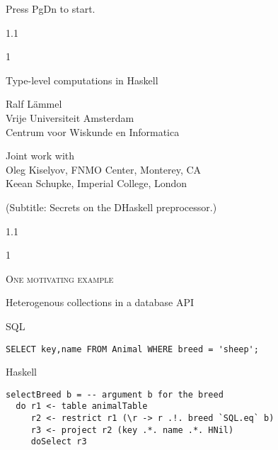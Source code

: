 \documentclass{slides}
\newcommand{\header}[1]{{\large\scshape \color{Red} #1} \medskip }
\newcommand{\blau}[1]{{\color{Blue} #1} \medskip }
\newenvironment{myslide}{\begin{slide}\color{Blue}\begin{boxedminipage}{1.1\hsize}\begin{boxedminipage}{1\hsize}\color{Black}
\vspace{-170\in}
}{%
\smallskip
\end{boxedminipage}
\end{boxedminipage}
\end{slide}}
\begin{document}
\pagestyle{empty}



\begin{slide}

Press PgDn to start.

\end{slide}






\begin{myslide}

\bigskip

\header{
\begin{center}
Type-level computations in Haskell
\end{center}
}

\vspace{200\in}

\blau{Ralf L{\"a}mmel\\
Vrije Universiteit Amsterdam\\
Centrum voor Wiskunde en Informatica}

\bigskip
Joint work with\\
Oleg Kiselyov, FNMO Center, Monterey, CA\\
Keean Schupke, Imperial College, London

\bigskip
\bigskip

(Subtitle: Secrets on the DHaskell preprocessor.)

\bigskip

\end{myslide}






\begin{myslide}

\header{One motivating example}

Heterogenous collections in a database API

\bigskip

\blau{SQL}

\begin{Verbatim}[fontseries=normal,fontsize=\tiny]
SELECT key,name FROM Animal WHERE breed = 'sheep';
\end{Verbatim}

\blau{Haskell}

\begin{Verbatim}[fontseries=normal,fontsize=\tiny]
selectBreed b = -- argument b for the breed
  do r1 <- table animalTable
     r2 <- restrict r1 (\r -> r .!. breed `SQL.eq` b)
     r3 <- project r2 (key .*. name .*. HNil)
     doSelect r3
\end{Verbatim}

\end{myslide}
\end{document}
